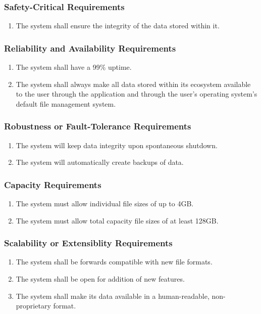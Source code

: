 \documentclass{article}
\begin{document}
\subsubsection{Safety-Critical Requirements}
\begin{enumerate}
    \item The system shall ensure the integrity of the data stored within it.
\end{enumerate}

\subsubsection{Reliability and Availability Requirements}
\begin{enumerate}
    \item The system shall have a 99\% uptime.
    \item The system shall always make all data stored within its ecosystem available to the user through the application and through the user's operating system's default file management system.
\end{enumerate}

\subsubsection{Robustness or Fault-Tolerance Requirements}
\begin{enumerate}
    \item The system will keep data integrity upon spontaneous shutdown.
    \item The system will automatically create backups of data.
\end{enumerate}

\subsubsection{Capacity Requirements}
\begin{enumerate}
    \item The system must allow individual file sizes of up to 4GB.
    \item The system must allow total capacity file sizes of at least 128GB.
\end{enumerate}

\subsubsection{Scalability or Extensiblity Requirements}
\begin{enumerate}
    \item The system shall be forwards compatible with new file formats.
    \item The system shall be open for addition of new features.
    \item The system shall make its data available in a human-readable, non-proprietary format.
\end{enumerate}
\end{document}
